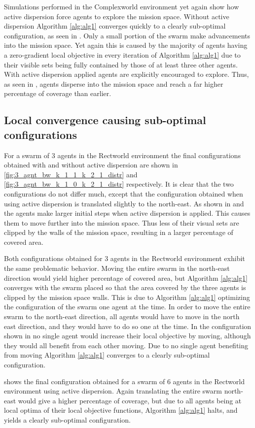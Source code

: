Simulations performed in the Complexworld environment yet again show how active dispersion force agents to explore the mission space. Without active dispersion Algorithm \ref{alg:alg1} converges quickly to a clearly sub-optimal
configuration, as seen in . Only a small portion of the swarm make advancements into the mission space. Yet again this is caused by the majority of agents having a zero-gradient
local objective in every iteration of Algorithm \ref{alg:alg1} due to their visible sets being fully contained by those of at least three other agents. With active dispersion applied agents are explicitly encouraged to explore. Thus, as seen in , agents disperse into the mission space and 
reach a far higher percentage of coverage than earlier. 

\subsection{Local convergence causing sub-optimal configurations}
For a swarm of 3 agents in the Rectworld environment the final configurations obtained with 
and without active dispersion are shown in 
\ref{fig:3_agnt_bw_k_1_1_k_2_1_distr} and \ref{fig:3_agnt_bw_k_1_0_k_2_1_distr} respectively. It is clear that the two configurations do not differ much, except that the configuration obtained when using active dispersion
is translated slightly to the north-east. As shown in  and  the agents make larger initial steps when active dispersion is applied. This
causes them to move further into the mission space. Thus less of their visual sets are clipped by the walls of the mission space, resulting in a larger percentage of covered area.

Both configurations obtained for 3 agents in the Rectworld environment exhibit the same problematic behavior. Moving the entire swarm in the north-east direction would yield higher percentage of covered area,
but Algorithm \ref{alg:alg1} converges with the swarm placed so that the area covered by the three agents is clipped by the mission space walls. This is due to Algorithm \ref{alg:alg1} optimizing
the configuration of the swarm one agent at the time. In order to move the entire swarm to the north-east direction, all agents would have to move in the north east direction, and they
would have to do so one at the time. In the configuration shown in  no single agent would increase their local objective by moving, although they would all benefit from each other moving.
Due to no single agent benefiting from moving Algorithm \ref{alg:alg1} converges to a clearly sub-optimal configuration.

 shows the final configuration obtained for a swarm of 6 agents in the Rectworld environment using active dispersion. Again translating the
entire swarm north-east would give a higher percentage of coverage, but due to all agents being at local optima of their local objective functions, Algorithm \ref{alg:alg1} halts, and yields
a clearly sub-optimal configuration.